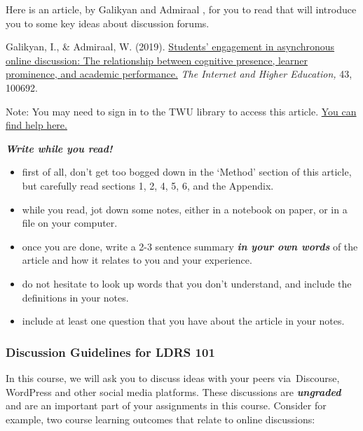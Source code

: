 \documentclass[
]{book}
\providecommand{\tightlist}{%
  \setlength{\itemsep}{0pt}\setlength{\parskip}{0pt}}
\theoremstyle{definition}
\theoremstyle{definition}
\theoremstyle{definition}
\theoremstyle{definition}
\theoremstyle{remark}
\begin{document}
\begin{reflect}
Here is an article, by Galikyan and Admiraal \citeyearpar{galikyanStudentsEngagementAsynchronous2019}, for you to read that will introduce you to some key ideas about discussion forums.

Galikyan, I., \& Admiraal, W. (2019). \href{https://twu.idm.oclc.org/login?url=https://search.ebscohost.com/login.aspx?direct=true\&db=edselp\&AN=S1096751619304105\&site=eds-live\&scope=site}{Students' engagement in asynchronous online discussion: The relationship between cognitive presence, learner prominence, and academic performance.} \emph{The Internet and Higher Education,} 43, 100692.

Note: You may need to sign in to the TWU library to access this article. \href{https://libguides.twu.ca/help}{You can find help here.}

\textbf{\emph{Write while you read!}}

\begin{itemize}
\tightlist
\item
  first of all, don't get too bogged down in the `Method' section of this article, but carefully read sections 1, 2, 4, 5, 6, and the Appendix.\\
\item
  while you read, jot down some notes, either in a notebook on paper, or in a file on your computer.\\
\item
  once you are done, write a 2-3 sentence summary \textbf{\emph{in your own words}} of the article and how it relates to you and your experience.\\
\item
  do not hesitate to look up words that you don't understand, and include the definitions in your notes.\\
\item
  include at least one question that you have about the article in your notes.
\end{itemize}
\end{reflect}

\hypertarget{discussion-guidelines-for-ldrs-101}{%
\subsubsection*{Discussion Guidelines for LDRS 101}\label{discussion-guidelines-for-ldrs-101}}

In this course, we will ask you to discuss ideas with your peers via~Discourse, WordPress and other social media platforms. These discussions are \textbf{\emph{ungraded}} and are an important part of your assignments in this course. Consider for example, two course learning outcomes that relate to online discussions:
\end{document}
